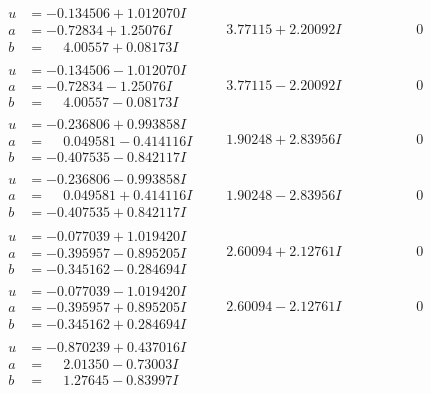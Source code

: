 \documentclass[1p]{elsarticle_modified}
\theoremstyle{definition}
\begin{document}
$$\begin{array}{c|c|c}
\begin{aligned}
u &= -0.134506 + 1.012070 I \\
a &= -0.72834 + 1.25076 I \\
b &= \phantom{-}4.00557 + 0.08173 I\end{aligned}
 & \phantom{-}3.77115 + 2.20092 I & \phantom{-0.000000 } 0 \\ \hline\begin{aligned}
u &= -0.134506 - 1.012070 I \\
a &= -0.72834 - 1.25076 I \\
b &= \phantom{-}4.00557 - 0.08173 I\end{aligned}
 & \phantom{-}3.77115 - 2.20092 I & \phantom{-0.000000 } 0 \\ \hline\begin{aligned}
u &= -0.236806 + 0.993858 I \\
a &= \phantom{-}0.049581 - 0.414116 I \\
b &= -0.407535 - 0.842117 I\end{aligned}
 & \phantom{-}1.90248 + 2.83956 I & \phantom{-0.000000 } 0 \\ \hline\begin{aligned}
u &= -0.236806 - 0.993858 I \\
a &= \phantom{-}0.049581 + 0.414116 I \\
b &= -0.407535 + 0.842117 I\end{aligned}
 & \phantom{-}1.90248 - 2.83956 I & \phantom{-0.000000 } 0 \\ \hline\begin{aligned}
u &= -0.077039 + 1.019420 I \\
a &= -0.395957 - 0.895205 I \\
b &= -0.345162 - 0.284694 I\end{aligned}
 & \phantom{-}2.60094 + 2.12761 I & \phantom{-0.000000 } 0 \\ \hline\begin{aligned}
u &= -0.077039 - 1.019420 I \\
a &= -0.395957 + 0.895205 I \\
b &= -0.345162 + 0.284694 I\end{aligned}
 & \phantom{-}2.60094 - 2.12761 I & \phantom{-0.000000 } 0 \\ \hline\begin{aligned}
u &= -0.870239 + 0.437016 I \\
a &= \phantom{-}2.01350 - 0.73003 I \\
b &= \phantom{-}1.27645 - 0.83997 I\end{aligned}

\end{array}$$
\end{document}
